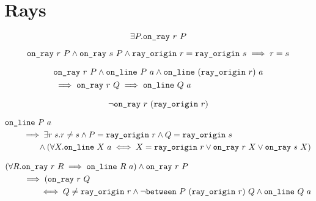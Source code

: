 \section{Rays}
\begin{equation*}
  \exists P. \texttt{on\_ray}\ r\ P
\end{equation*}

\begin{equation*}
    \texttt{on\_ray}\ r\ P \wedge \texttt{on\_ray}\ s\ P\wedge\texttt{ray\_origin}\ r = \texttt{ray\_origin}\ s\implies r = s
\end{equation*}

\begin{equation*}
  \begin{split}
    &\texttt{on\_ray}\ r\ P \wedge \texttt{on\_line}\ P\ a \wedge \texttt{on\_line}\ (\texttt{ray\_origin}\ r)\ a\\
    &\implies \texttt{on\_ray}\ r\ Q \implies \texttt{on\_line}\ Q\ a
  \end{split}
\end{equation*}

\begin{equation*}
\neg\texttt{on\_ray}\ r\ (\texttt{ray\_origin}\ r)
\end{equation*}

\begin{equation*}
  \begin{split}
    &\texttt{on\_line}\ P\ a\\
    &\qquad\implies \exists r\;s. r \neq s\wedge P = \texttt{ray\_origin}\ r \wedge Q = \texttt{ray\_origin}\ s\\
    &\qquad\qquad \wedge (\forall X. \texttt{on\_line}\ X\ a \iff X = \texttt{ray\_origin}\ r \vee \texttt{on\_ray}\ r\ X \vee \texttt{on\_ray}\ s\ X)
    \end{split}
\end{equation*}

\begin{equation*}
  \begin{split}
    &(\forall R. \texttt{on\_ray}\ r\ R \implies \texttt{on\_line}\ R\ a) \wedge \texttt{on\_ray}\ r\ P\\
    &\qquad\implies (\texttt{on\_ray}\ r\ Q\\
    &\qquad\qquad\iff Q \neq \texttt{ray\_origin}\ r \wedge \neg\texttt{between}\ P\ (\texttt{ray\_origin}\ r)\ Q \wedge \texttt{on\_line}\ Q\ a
  \end{split}
\end{equation*}
